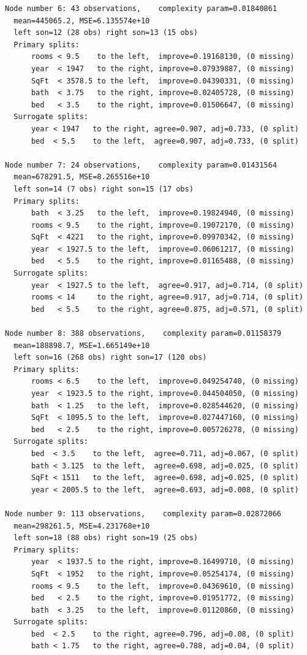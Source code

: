 \documentclass[11pt,a4paper]{article}
\begin{document}
\begin{lstlisting}[style=console]
Node number 6: 43 observations,    complexity param=0.01840861
  mean=445065.2, MSE=6.135574e+10 
  left son=12 (28 obs) right son=13 (15 obs)
  Primary splits:
      rooms < 9.5    to the left,  improve=0.19168130, (0 missing)
      year  < 1947   to the right, improve=0.07939887, (0 missing)
      SqFt  < 3578.5 to the left,  improve=0.04390331, (0 missing)
      bath  < 3.75   to the right, improve=0.02405728, (0 missing)
      bed   < 3.5    to the right, improve=0.01506647, (0 missing)
  Surrogate splits:
      year < 1947   to the right, agree=0.907, adj=0.733, (0 split)
      bed  < 5.5    to the left,  agree=0.907, adj=0.733, (0 split)

Node number 7: 24 observations,    complexity param=0.01431564
  mean=678291.5, MSE=8.265516e+10 
  left son=14 (7 obs) right son=15 (17 obs)
  Primary splits:
      bath  < 3.25   to the left,  improve=0.19824940, (0 missing)
      rooms < 9.5    to the right, improve=0.19072170, (0 missing)
      SqFt  < 4221   to the right, improve=0.09970342, (0 missing)
      year  < 1927.5 to the left,  improve=0.06061217, (0 missing)
      bed   < 5.5    to the right, improve=0.01165488, (0 missing)
  Surrogate splits:
      year  < 1927.5 to the left,  agree=0.917, adj=0.714, (0 split)
      rooms < 14     to the right, agree=0.917, adj=0.714, (0 split)
      bed   < 5.5    to the right, agree=0.875, adj=0.571, (0 split)

Node number 8: 388 observations,    complexity param=0.01158379
  mean=188898.7, MSE=1.665149e+10 
  left son=16 (268 obs) right son=17 (120 obs)
  Primary splits:
      rooms < 6.5    to the left,  improve=0.049254740, (0 missing)
      year  < 1923.5 to the right, improve=0.044504050, (0 missing)
      bath  < 1.25   to the left,  improve=0.028544620, (0 missing)
      SqFt  < 1095.5 to the left,  improve=0.027447160, (0 missing)
      bed   < 2.5    to the right, improve=0.005726278, (0 missing)
  Surrogate splits:
      bed  < 3.5    to the left,  agree=0.711, adj=0.067, (0 split)
      bath < 3.125  to the left,  agree=0.698, adj=0.025, (0 split)
      SqFt < 1511   to the left,  agree=0.698, adj=0.025, (0 split)
      year < 2005.5 to the left,  agree=0.693, adj=0.008, (0 split)

Node number 9: 113 observations,    complexity param=0.02872066
  mean=298261.5, MSE=4.231768e+10 
  left son=18 (88 obs) right son=19 (25 obs)
  Primary splits:
      year  < 1937.5 to the right, improve=0.16499710, (0 missing)
      SqFt  < 1952   to the right, improve=0.05254174, (0 missing)
      rooms < 9.5    to the left,  improve=0.04369610, (0 missing)
      bed   < 2.5    to the right, improve=0.01951772, (0 missing)
      bath  < 3.25   to the left,  improve=0.01120860, (0 missing)
  Surrogate splits:
      bed  < 2.5    to the right, agree=0.796, adj=0.08, (0 split)
      bath < 1.75   to the right, agree=0.788, adj=0.04, (0 split)


\end{lstlisting}
\end{document}
